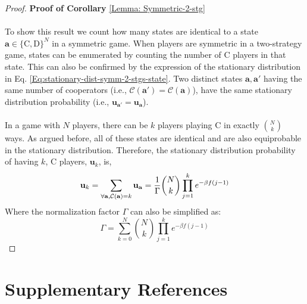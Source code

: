 \documentclass[11pt]{article}
\theoremstyle{plainCl1}
\theoremstyle{plainCl2}
\newcommand{\abf}{\mathbf{a}}
\newcommand{\ubf}{\mathbf{u}}
\newcommand{\C}{\mathrm{C}}
\newcommand{\D}{\mathrm{D}}
\begin{document}
\newpage
\begin{proof}
\textbf{Proof of Corollary} \ref{Lemma: Symmetric-2-stg} \\ \\
To show this result we count how many states are identical to a state $\abf \in \{\C,\D\}^N$ in a symmetric game. When players are symmetric in a two-strategy game, states can be enumerated by counting the number of $\C$ players in that state. This can also be confirmed by the expression of the stationary distribution in Eq. \ref{Eq:stationary-dist-symm-2-stgs-state}. Two distinct states $\abf, \abf'$ having the same number of cooperators (i.e., $\mathcal{C}(\abf') = \mathcal{C}(\abf)$), have the same stationary distribution probability (i.e., $\ubf_{\abf'} = \ubf_{\abf}$).
\\ \\ 
\noindent In a game with $N$ players, there can be $k$ players playing $\C$ in exactly $N \choose k$ ways. As argued before, all of these states are identical and are also equiprobable in the stationary distribution. Therefore, the stationary distribution probability of having $k$, $\C$ players, $\ubf_{k}$, is,
\begin{equation}
\ubf_{k} = \sum_{\forall \abf,  \mathcal{C(\abf)} = k} \ubf_\abf = \frac{1}{\Gamma} {N \choose k} \prod_{j=1}^k e^{-\beta f(j-1)} \\[10pt]
\end{equation} 
\noindent Where the normalization factor $\Gamma$ can also be simplified as: 
\begin{equation}
\Gamma = \sum_{k=0}^N {N \choose k} \prod_{j=1}^k e^{-\beta f(j-1)}
\end{equation}
\end{proof}
\newpage
\section*{Supplementary References}


\end{document}
